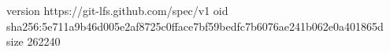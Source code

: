 version https://git-lfs.github.com/spec/v1
oid sha256:5e711a9b46d005e2af8725c0fface7bf59bedfc7b6076ae241b062e0a401865d
size 262240
